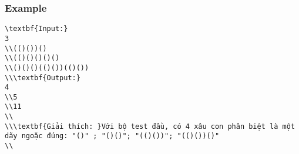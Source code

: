 \subsubsection{   Example  }
\begin{verbatim}
\textbf{Input:}
3
\\(()())()
\\(()()()()()
\\()()()(()())(()())
\\\textbf{Output:}
4
\\5
\\11
\\
\\\textbf{Giải thích: }Với bộ test đầu, có 4 xâu con phân biệt là một dãy ngoặc đúng: "()" ; "()()"; "(()())"; "(()())()"
\\\end{verbatim}